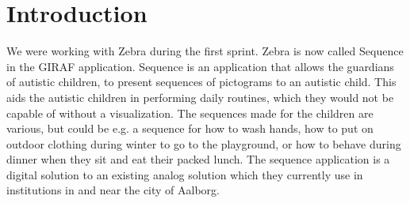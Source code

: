\section{Introduction}
We were working with Zebra during the first sprint. Zebra is now called Sequence in the GIRAF application. Sequence is an application that allows the guardians of autistic children, to present sequences of pictograms to an autistic child. This aids the autistic children in performing daily routines, which they would not be capable of without a visualization. The sequences made for the children are various, but could be e.g. a sequence for how to wash hands, how to put on outdoor clothing during winter to go to the playground, or how to behave during dinner when they sit and eat their packed lunch. The sequence application is a digital solution to an existing analog solution which they currently use in institutions in and near the city of Aalborg.


